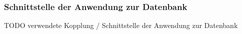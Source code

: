 \subsubsection{Schnittstelle der Anwendung zur Datenbank}
TODO
verwendete Kopplung / Schnittstelle der Anwendung zur Datenbank